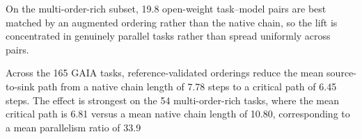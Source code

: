 
On the multi-order-rich subset, 19.8%
open-weight task--model pairs are best matched by an augmented ordering rather
than the native chain, so the lift is concentrated in genuinely parallel tasks
rather than spread uniformly across pairs.

Across the 165 GAIA tasks, reference-validated orderings reduce the mean
source-to-sink path
from a native chain length of 7.78 steps to a critical
path of 6.45 steps. The effect is strongest on the 54
multi-order-rich tasks, where the mean critical path is
6.81 versus a mean native chain length of
10.80, corresponding to a mean parallelism ratio of
33.9%
